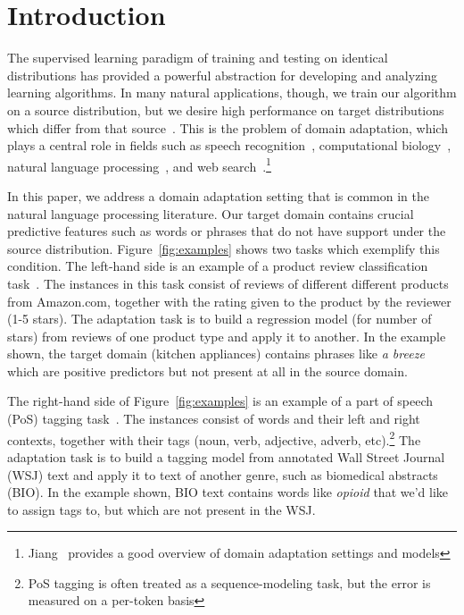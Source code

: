 \section{Introduction}
\label{sec:intro}

The supervised learning paradigm of training and testing on identical
distributions has provided a powerful abstraction for developing and
analyzing learning algorithms.  In many natural applications, though,
we train our algorithm on a source distribution, but we desire high
performance on target distributions which differ from that
source~\cite{huang07,xue08,blitzer08,mansour09}.  This is the
problem of domain adaptation, which plays a central role in fields
such as speech recognition~\cite{legetter95}, computational
biology~\cite{liu08}, natural language
processing~\cite{blitzer06,daume07,guo09}, and web
search~\cite{chen08,gao09}.\footnote{Jiang~\cite{JiangReview} provides
  a good overview of domain adaptation settings and models}

In this paper, we address a domain adaptation setting that is common
in the natural language processing literature.  Our target domain
contains crucial predictive features such as words or phrases that do
not have support under the source distribution.
Figure~\ref{fig:examples} shows two tasks which exemplify this
condition.  The left-hand side is an example of a product review
classification task~\cite{blitzer07,dredze08,mansour09}.  The
instances in this task consist of reviews of different different
products from Amazon.com, together with the rating given to the
product by the reviewer (1-5 stars).  The adaptation task is to build
a regression model (for number of stars) from reviews of one product
type and apply it to another.  In the example shown, the target domain
(kitchen appliances) contains phrases like \emph{a breeze} which are
positive predictors but not present at all in the source domain.

The right-hand side of Figure~\ref{fig:examples} is an example of a
part of speech (PoS) tagging
task~\cite{ratnaparkhi96,blitzer06,huangyates}.  The instances consist
of words and their left and right contexts, together with their tags
(noun, verb, adjective, adverb, etc).\footnote{PoS tagging is often
  treated as a sequence-modeling task, but the error is measured on a
  per-token basis} The adaptation task is to build a tagging model
from annotated Wall Street Journal (WSJ) text and apply it to text of
another genre, such as biomedical abstracts (BIO).  In the example
shown, BIO text contains words like \emph{opioid} that we'd like to
assign tags to, but which are not present in the WSJ.

